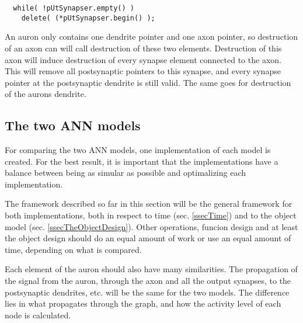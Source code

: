 \begin{lstlisting}
  while( !pUtSynapser.empty() )
  	delete( (*pUtSynapser.begin() );
\end{lstlisting}

	An auron only contains one dendrite pointer and one axon pointer, so destruction of an axon can will call destruction of these two elements.
	Destruction of this axon will induce destruction of every synapse element connected to the axon. This will remove all postsynaptic pointers to this synapse, and every synapse pointer at the postsynaptic dendrite is still valid.
	The same goes for destruction of the aurons dendrite.
	


	


	\subsection{The two ANN models}

	For comparing the two ANN models, one implementation of each model is created. 
	For the best result, it is important that the implementations have a balance between being as simular as possible and optimalizing each implementation.

	The framework described so far in this section will be the general framework for both implementations, both in respect to time (sec. \ref{ssecTime}) and to the object model (sec. \ref{ssecTheObjectDesign}).
	Other operations, funcion design and at least the object design should do an equal amount of work or use an equal amount of time, depending on what is compared. %

	Each element of the auron should also have many similarities. The propagation of the signal from the auron, through the axon and all the output synapses, to the postsynaptic dendrites, etc. will be the same for the two models.
	The difference lies in what propagates through the graph, and how the activity level of each node is calculated. 
	
